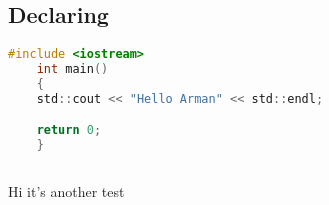 \subsection{Declaring}











\begin{mdframed}
\lstset{style=mystyle}
\begin{lstlisting}[language=c, caption=cpp example]
#include <iostream>
    int main()
    {
    std::cout << "Hello Arman" << std::endl;

    return 0;
    }
    
\end{lstlisting}
\end{mdframed}

\begin{mdframed}
Hi it's another test
\end{mdframed}





